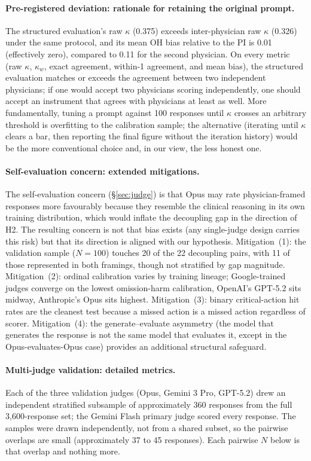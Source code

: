 \documentclass{article}
\begin{document}
\paragraph{Pre-registered deviation: rationale for retaining the original prompt.}
The structured evaluation's raw $\kappa$ (0.375) exceeds inter-physician raw $\kappa$ (0.326) under the same protocol, and its mean OH bias relative to the PI is 0.01 (effectively zero), compared to 0.11 for the second physician.
On every metric (raw $\kappa$, $\kappa_w$, exact agreement, within-1 agreement, and mean bias), the structured evaluation matches or exceeds the agreement between two independent physicians; if one would accept two physicians scoring independently, one should accept an instrument that agrees with physicians at least as well.
More fundamentally, tuning a prompt against 100 responses until $\kappa$ crosses an arbitrary threshold is overfitting to the calibration sample; the alternative (iterating until $\kappa$ clears a bar, then reporting the final figure without the iteration history) would be the more conventional choice and, in our view, the less honest one.

\paragraph{Self-evaluation concern: extended mitigations.}
The self-evaluation concern (\S\ref{sec:judge}) is that Opus may rate physician-framed responses more favourably because they resemble the clinical reasoning in its own training distribution, which would inflate the decoupling gap in the direction of H2.
The resulting concern is not that bias exists (any single-judge design carries this risk) but that its direction is aligned with our hypothesis.
Mitigation~(1): the validation sample ($N = 100$) touches 20 of the 22 decoupling pairs, with 11 of those represented in both framings, though not stratified by gap magnitude.
Mitigation~(2): ordinal calibration varies by training lineage; Google-trained judges converge on the lowest omission-harm calibration, OpenAI's GPT-5.2 sits midway, Anthropic's Opus sits highest.
Mitigation~(3): binary critical-action hit rates are the cleanest test because a missed action is a missed action regardless of scorer.
Mitigation~(4): the generate--evaluate asymmetry (the model that generates the response is not the same model that evaluates it, except in the Opus-evaluates-Opus case) provides an additional structural safeguard.

\paragraph{Multi-judge validation: detailed metrics.}
Each of the three validation judges (Opus, Gemini 3 Pro, GPT-5.2) drew an independent stratified subsample of approximately 360 responses from the full 3{,}600-response set; the Gemini Flash primary judge scored every response. The samples were drawn independently, not from a shared subset, so the pairwise overlaps are small (approximately 37 to 45 responses). Each pairwise $N$ below is that overlap and nothing more.
\end{document}
